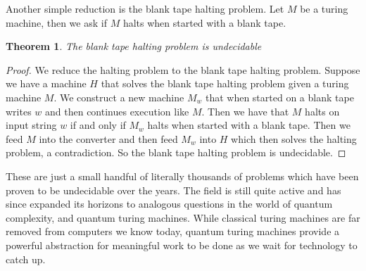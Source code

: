 \documentclass[11pt]{exam}
\newtheorem{theorem}{Theorem}[section]
\begin{document}
Another simple reduction is the blank tape halting problem. Let $M$ be a turing machine, then we ask if $M$ halts when started with a blank tape.\\

\begin{theorem}
The blank tape halting problem is undecidable
\end{theorem}

\begin{proof}
We reduce the halting problem to the blank tape halting problem. Suppose we have a machine $H$ that solves the blank tape halting problem given a turing machine $M$. We construct a new machine $M_w$ that when started on a blank tape writes $w$ and then continues execution like $M$. Then we have that $M$ halts on input string $w$ if and only if $M_w$ halts when started with a blank tape. Then we feed $M$ into the converter and then feed $M_w$ into $H$ which then solves the halting problem, a contradiction. So the blank tape halting problem is undecidable.
\end{proof}

These are just a small handful of literally thousands of problems which have been proven to be undecidable over the years. The field is still quite active and has since expanded its horizons to analogous questions in the world of quantum complexity, and quantum turing machines. While classical turing machines are far removed from computers we know today, quantum turing machines provide a powerful abstraction for meaningful work to be done as we wait for technology to catch up.  
\end{document}
